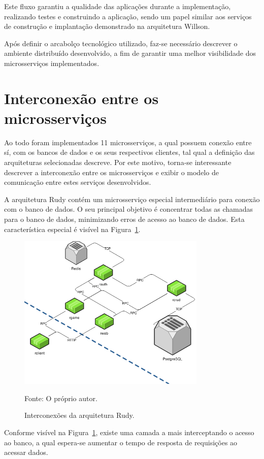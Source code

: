 Este fluxo garantiu a qualidade das aplicações durante a implementação, realizando testes e construindo a aplicação, sendo um papel similar aos serviços de construção e implantação demonstrado na arquitetura Willson.

Após definir o arcabolço tecnológico utilizado, faz-se necessário descrever o ambiente distribuído desenvolvido, a fim de garantir uma melhor visibilidade dos microsserviços implementados.

\section{Interconexão entre os microsserviços}
\label{sec:interconexao}

Ao todo foram implementados 11 microsserviços, a qual possuem conexão entre sí, com os bancos de dados e os seus respectivos clientes, tal qual a definição das arquiteturas selecionadas descreve.
%
Por este motivo, torna-se interessante descrever a interconexão entre os microsserviços e exibir o modelo de comunicação entre estes serviços desenvolvidos.

A arquitetura Rudy contém um microsserviço especial intermediário para conexão com o banco de dados.
%
O seu principal objetivo é concentrar todas as chamadas para o banco de dados, minimizando erros de acesso ao banco de dados.
%
Esta característica especial é visível na Figura~\ref{fig:interconexao_rudy}.

\begin{figure}[htb!]
  \caption{Interconexões da arquitetura Rudy.}
  \label{fig:interconexao_rudy}
  \includegraphics[width=0.8\textwidth]{figuras/interconexoes/rudy.png}
  \centering

  Fonte: O próprio autor.
\end{figure}

Conforme visível na Figura~\ref{fig:interconexao_rudy}, existe uma camada a mais interceptando o acesso ao banco, a qual espera-se aumentar o tempo de resposta de requisições ao acessar dados.

